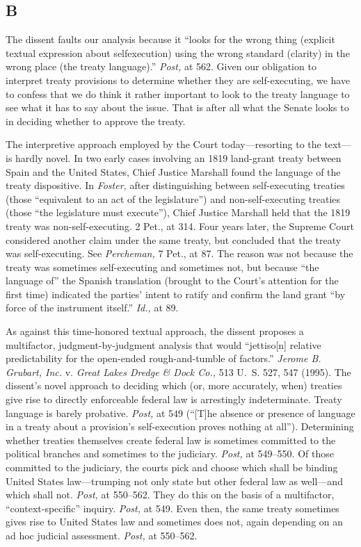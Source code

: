 \subsection{B}

  The dissent faults our analysis because it ``looks for the wrong
thing (explicit textual expression about selfexecution) using the
wrong standard (clarity) in the wrong place (the treaty language).''
\emph{Post,} at 562. Given our obligation to interpret treaty
provisions to determine whether they are self-executing, we have to
confess that we do think it rather important to look to the treaty
language to see what it has to say about the issue. That is after all
what the Senate looks to in deciding whether to approve the treaty.

  The interpretive approach employed by the Court today---resorting
to the text---is hardly novel. In two early cases involving an
1819 land-grant treaty between Spain and the United States, Chief
Justice Marshall found the language of the treaty dispositive. In
\emph{Foster,} after distinguishing between self-executing treaties (those
``equivalent to an act of the legislature'') and non-self-executing
treaties (those ``the legislature must execute''), Chief Justice
Marshall held that the 1819 treaty was non-self-executing. 2 Pet.,
at 314. Four years later, the Supreme Court considered another claim
under the same treaty, but concluded that the treaty was self-executing.
See \emph{Percheman,} 7 Pet., at 87. The reason was not because the
treaty was sometimes self-executing and sometimes not, but because
``the language of'' the Spanish translation (brought to the Court's
attention for the first time) indicated the parties' intent to ratify
and confirm the land grant ``by force of the instrument itself.''
\emph{Id.,} at 89.

  As against this time-honored textual approach, the dissent proposes
a multifactor, judgment-by-judgment analysis that would ``jettiso[n]
relative predictability for the open-ended rough-and-tumble of
factors.'' \emph{Jerome B. Grubart, Inc.} v. \emph{Great Lakes Dredge \&
Dock Co.,} 513 U.~S. 527, 547 (1995). \newpage  The dissent's novel
approach to deciding which (or, more accurately, when) treaties give
rise to directly enforceable federal law is arrestingly indeterminate.
Treaty language is barely probative. \emph{Post,} at 549 (``[T]he
absence or presence of language in a treaty about a provision's
self-execution proves nothing at all''). Determining whether treaties
themselves create federal law is sometimes committed to the political
branches and sometimes to the judiciary. \emph{Post,} at 549--550. Of
those committed to the judiciary, the courts pick and choose which shall
be binding United States law---trumping not only state but other federal
law as well---and which shall not. \emph{Post,} at 550--562. They do
this on the basis of a multifactor, ``context-specific'' inquiry.
\emph{Post,} at 549. Even then, the same treaty sometimes gives rise to
United States law and sometimes does not, again depending on an ad hoc
judicial assessment. \emph{Post,} at 550--562.


